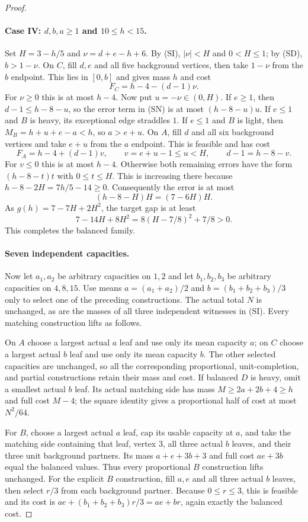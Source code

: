 \begin{proof}
\paragraph{Case IV: $d,b,a\geq1$ and $10\leq h<15$.}
Set $H=3-h/5$ and $\nu=d+e-h+6$.
By (SI), $|\nu|<H$ and $0<H\leq1$; by (SD), $b>1-\nu$.
On $C$, fill $d,e$ and all five background vertices, then take
$1-\nu$ from the $b$ endpoint. This lies in $[0,b]$ and gives mass $h$
and cost
\[
 F_C=h-4-(d-1)\nu. \tag{SN}
\]
For $\nu\geq0$ this is at most $h-4$.
Now put $u=-\nu\in(0,H)$.
If $e\geq1$, then $d-1\leq h-8-u$, so the error term in (SN)
is at most $(h-8-u)u$.
If $e\leq1$ and $B$ is heavy, its exceptional edge straddles $1$.
If $e\leq1$ and $B$ is light, then
$M_B=h+u+e-a<h$, so $a>e+u$.
On $A$, fill $d$ and all six background vertices and take $e+u$ from
the $a$ endpoint. This is feasible and has cost
\[
 F_A=h-4+(d-1)v,\qquad v=e+u-1\leq u<H,
 \qquad d-1=h-8-v.
\]
For $v\leq0$ this is at most $h-4$.
Otherwise both remaining errors have the form $(h-8-t)t$ with
$0\leq t\leq H$. This is increasing there because
$h-8-2H=7h/5-14\geq0$. Consequently the error is at most
\[
 (h-8-H)H=(7-6H)H.
\]
As $g(h)=7-7H+2H^2$, the target gap is at least
\[
 7-14H+8H^2=8(H-7/8)^2+7/8>0.
\]
This completes the balanced family.

\paragraph{Seven independent capacities.}
Now let $a_1,a_2$ be arbitrary capacities on $1,2$ and let
$b_1,b_2,b_3$ be arbitrary capacities on $4,8,15$.
Use means $a=(a_1+a_2)/2$ and $b=(b_1+b_2+b_3)/3$ only to select
one of the preceding constructions. The actual total $N$ is unchanged,
as are the masses of all three independent witnesses in (SI).
Every matching construction lifts as follows.

On $A$ choose a largest actual $a$ leaf and use only its mean capacity
$a$; on $C$ choose a largest actual $b$ leaf and use only its mean
capacity $b$. The other selected capacities are unchanged, so all the
corresponding proportional, unit-completion, and partial constructions
retain their mass and cost.
If balanced $D$ is heavy, omit a smallest actual $b$ leaf. Its actual
matching side has mass $M\geq2a+2b+4\geq h$ and full cost $M-4$;
the square identity gives a proportional half of cost at most $N^2/64$.

For $B$, choose a largest actual $a$ leaf, cap its usable capacity at
$a$, and take the matching side containing that leaf, vertex $3$, all
three actual $b$ leaves, and their three unit background partners.
Its mass $a+e+3b+3$ and full cost $ae+3b$ equal the balanced values.
Thus every proportional $B$ construction lifts unchanged.
For the explicit $B$ construction, fill $a,e$ and all three actual
$b$ leaves, then select $r/3$ from each background partner.
Because $0\leq r\leq3$, this is feasible and its cost is
$ae+(b_1+b_2+b_3)r/3=ae+br$, again exactly the balanced cost.


\end{proof}
